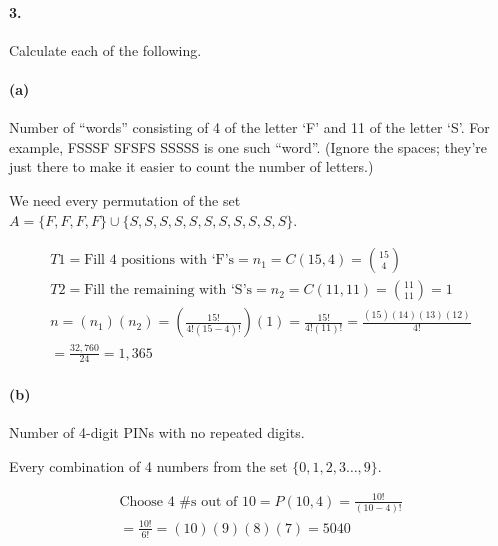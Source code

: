     \paragraph*{3.}
    Calculate each of the following.

    \paragraph*{(a)}
    Number of “words” consisting of 4 of the letter `F' and 11 of the letter `S'. For example, FSSSF SFSFS SSSSS is one such “word”. (Ignore the spaces; they're just there to make it easier to count the number of letters.)

    \begin{mdframed}
        We need every permutation of the set $A = \{F,F,F,F\} \cup \{S,S,S,S,S,S,S,S,S,S,S\}$. 
        
        \begin{equation*}
            \begin{gathered}
                T1 = \text{Fill 4 positions with `F's} = n_1 = C(15, 4) = {15 \choose 4}      \\
                T2 = \text{Fill the remaining with `S's} = n_2 = C(11, 11) = {11 \choose 11} = 1   \\
                n = (n_1)(n_2) = \left(\frac{15!}{4!(15-4)!}\right)(1) = \frac{15!}{4!(11)!} = \frac{(15)(14)(13)(12)}{4!}  \\
                = \frac{32,760}{24} = \boxed{1,365}
            \end{gathered}
        \end{equation*}
    \end{mdframed}

    \paragraph*{(b)}
    Number of 4-digit PINs with no repeated digits.

    \begin{mdframed}
        Every combination of 4 numbers from the set $\{0,1,2,3\dots,9\}$.

        \begin{equation*}
            \begin{gathered}
                \text{Choose 4 \#s out of 10} = P(10,4) = \frac{10!}{(10-4)!}    \\
                = \frac{10!}{6!} = (10)(9)(8)(7) = \boxed{5040}
            \end{gathered}
        \end{equation*}
    \end{mdframed}

